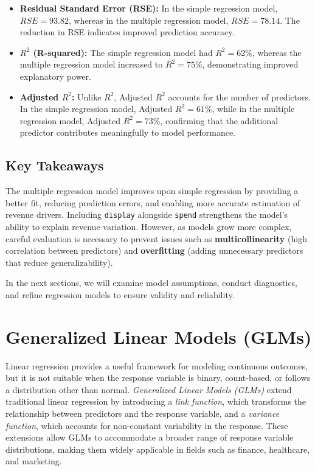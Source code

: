 \documentclass[
  11pt,
]{book}
\newcommand{\passthrough}[1]{#1}
\theoremstyle{definition}
\theoremstyle{definition}
\theoremstyle{definition}
\theoremstyle{definition}
\theoremstyle{remark}
\begin{document}
\begin{itemize}
\item
  \textbf{Residual Standard Error (RSE):} In the simple regression model, \(RSE = 93.82\), whereas in the multiple regression model, \(RSE = 78.14\). The reduction in RSE indicates improved prediction accuracy.
\item
  \textbf{\(R^2\) (R-squared):} The simple regression model had \(R^2 = 62\%\), whereas the multiple regression model increased to \(R^2 = 75\%\), demonstrating improved explanatory power.
\item
  \textbf{Adjusted \(R^2\):} Unlike \(R^2\), Adjusted \(R^2\) accounts for the number of predictors. In the simple regression model, Adjusted \(R^2 = 61\%\), while in the multiple regression model, Adjusted \(R^2 = 73\%\), confirming that the additional predictor contributes meaningfully to model performance.
\end{itemize}

\subsection*{Key Takeaways}\label{key-takeaways-2}


The multiple regression model improves upon simple regression by providing a better fit, reducing prediction errors, and enabling more accurate estimation of revenue drivers. Including \passthrough{\lstinline!display!} alongside \passthrough{\lstinline!spend!} strengthens the model's ability to explain revenue variation. However, as models grow more complex, careful evaluation is necessary to prevent issues such as \textbf{multicollinearity} (high correlation between predictors) and \textbf{overfitting} (adding unnecessary predictors that reduce generalizability).

In the next sections, we will examine model assumptions, conduct diagnostics, and refine regression models to ensure validity and reliability.

\section{Generalized Linear Models (GLMs)}\label{generalized-linear-models-glms}

Linear regression provides a useful framework for modeling continuous outcomes, but it is not suitable when the response variable is binary, count-based, or follows a distribution other than normal. \emph{Generalized Linear Models (GLMs)} extend traditional linear regression by introducing a \emph{link function}, which transforms the relationship between predictors and the response variable, and a \emph{variance function}, which accounts for non-constant variability in the response. These extensions allow GLMs to accommodate a broader range of response variable distributions, making them widely applicable in fields such as finance, healthcare, and marketing.
\end{document}
